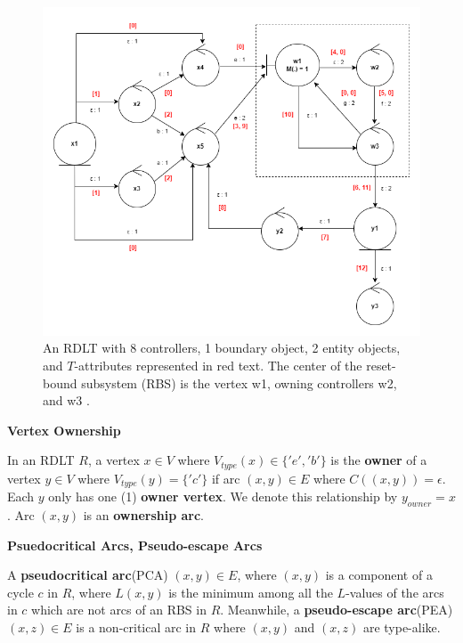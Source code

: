        \begin{figure}[h]
            \centering
            \includegraphics[scale=0.65]{figures/RDLT2_PJS.png}
            \caption{An RDLT with 8 controllers, 1 boundary object, 2 entity objects, and $T$-attributes represented in red text. The center of the reset-bound subsystem (RBS) is the vertex w1, owning controllers w2, and w3 \cite{malinao-pjs}.}
            \label{rdlt2}
        \end{figure} \par

        \begin{definition} \textbf{Vertex Ownership} \cite{yiu}
            
            In an RDLT $R$, a vertex $x \in V$ where $V_{type}(x) \in \{'e','b'\}$ is the \textbf{owner} of a vertex $y \in V$ where $V_{type}(y) = \{'c'\}$ if arc $ (x,y) \in E $ where $ C((x,y)) = \epsilon $. Each $y$ only has one (1) \textbf{owner vertex}. We denote this relationship by $y_{owner} = x $. Arc $ (x,y) $ is an \textbf{ownership arc}.
        
        \end{definition}

        \begin{definition} \textbf{Psuedocritical Arcs, Pseudo-escape Arcs} \cite{malinao-wctp}
            
            A \textbf{pseudocritical arc}(PCA) $(x,y)\in E$, where $(x,y)$ is a component of a cycle $c$ in $R$, where $L(x,y)$ is the minimum among all the $L$-values of the arcs in $c$ which are not arcs of an RBS in $R$.
            Meanwhile, a \textbf{pseudo-escape arc}(PEA) $(x,z) \in E$ is a non-critical arc in $R$ where $(x,y)$ and $(x,z)$ are type-alike.
        
        \end{definition}

